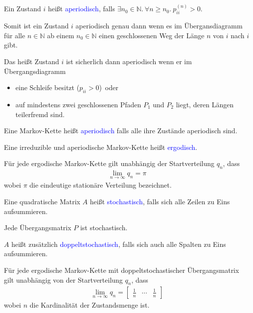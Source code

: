 \documentclass{beamer}
\def\padding{\vspace{0.5cm}}
\def\spadding{\vspace{0.25cm}}
\def\b{\textcolor{blue}}
\begin{document}
\begin{frame}
    \begin{definition}
        Ein Zustand $i$ heißt \b{aperiodisch}, falls $\exists n_0 \in \mathbb{N}.\ \forall n \geq n_0.\ p_{ii}^{(n)} > 0$.\pause\par\spadding
        Somit ist ein Zustand $i$ aperiodisch genau dann wenn es im Übergansdiagramm für alle $n \in \mathbb{N}$ ab einem $n_0 \in \mathbb{N}$ einen geschlossenen Weg der Länge $n$ von $i$ nach $i$ gibt.\pause\par\spadding
        Das heißt Zustand $i$ ist sicherlich dann aperiodisch wenn er im Übergangsdiagramm
        \begin{itemize}
            \item eine Schleife besitzt ($p_{ii} > 0$)\pause\ oder
            \item auf mindestens zwei geschlossenen Pfaden $P_1$ und $P_2$ liegt, deren Längen teilerfremd sind.
        \end{itemize}\pause\par\padding
        Eine Markov-Kette heißt \b{aperiodisch} falls alle ihre Zustände aperiodisch sind.
    \end{definition}
\end{frame}

\begin{frame}
    \begin{definition}
        Eine irreduzible und aperiodische Markov-Kette heißt \b{ergodisch}.
    \end{definition}\pause\par\padding
    Für jede ergodische Markov-Kette gilt unabhängig der Startverteilung $q_n$, dass
    \begin{align*}
        \lim_{n \to \infty} q_n = \pi
    \end{align*}
    wobei $\pi$ die eindeutige stationäre Verteilung bezeichnet.
\end{frame}

\begin{frame}
    \begin{definition}
        Eine quadratische Matrix $A$ heißt \b{stochastisch}, falls sich alle Zeilen zu Eins aufsummieren.\pause\par
        Jede Übergangsmatrix $P$ ist stochastisch.\pause\par\spadding
        $A$ heißt zusätzlich \b{doppeltstochastisch}, falls sich auch alle Spalten zu Eins aufsummieren.
    \end{definition}\pause\par\padding
    Für jede ergodische Markov-Kette mit doppeltstochastischer Übergangsmatrix gilt unabhängig von der Startverteilung $q_n$, dass
    \begin{align*}
        \lim_{n \to \infty} q_n = \begin{bmatrix}
            \frac{1}{n} & \cdots & \frac{1}{n}
        \end{bmatrix}
    \end{align*}
    wobei $n$ die Kardinalität der Zustandsmenge ist.
\end{frame}
\end{document}
